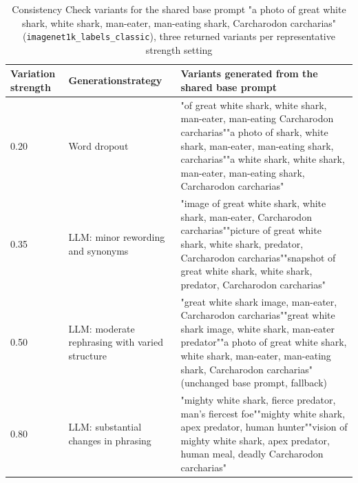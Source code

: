 \begin{table}[htbp]
\centering
\caption[Consistency Check variants for the shared base prompt (imagenet1k\_labels\_classic), three returned variants per representative strength setting]{Consistency Check variants for the shared base prompt "a photo of great white shark, white shark, man-eater, man-eating shark, Carcharodon carcharias" (\texttt{imagenet1k\_labels\_classic}), three returned variants per representative strength setting}
\label{tbl:consistency-check-variant-examples}
\small
\begin{tabular}{|p{2.1cm}|p{3.4cm}|p{9.2cm}|}
\hline
\textbf{Variation strength} & \textbf{Generation\newline strategy} & \textbf{Variants generated from the shared base prompt} \\
\hline
0.20 & Word dropout & "of great white shark, white shark, man-eater, man-eating Carcharodon carcharias"\newline "a photo of shark, white shark, man-eater, man-eating shark, carcharias"\newline "a white shark, white shark, man-eater, man-eating shark, Carcharodon carcharias" \\
\hline
0.35 & LLM: minor rewording and synonyms & "image of great white shark, white shark, man-eater, Carcharodon carcharias"\newline "picture of great white shark, white shark, predator, Carcharodon carcharias"\newline "snapshot of great white shark, white shark, predator, Carcharodon carcharias" \\
\hline
0.50 & LLM: moderate rephrasing with varied structure & "great white shark image, man-eater, Carcharodon carcharias"\newline "great white shark image, white shark, man-eater predator"\newline "a photo of great white shark, white shark, man-eater, man-eating shark, Carcharodon carcharias" (unchanged base prompt, fallback) \\
\hline
0.80 & LLM: substantial changes in phrasing & "mighty white shark, fierce predator, man's fiercest foe"\newline "mighty white shark, apex predator, human hunter"\newline "vision of mighty white shark, apex predator, human meal, deadly Carcharodon carcharias" \\
\hline
\end{tabular}
\end{table}

